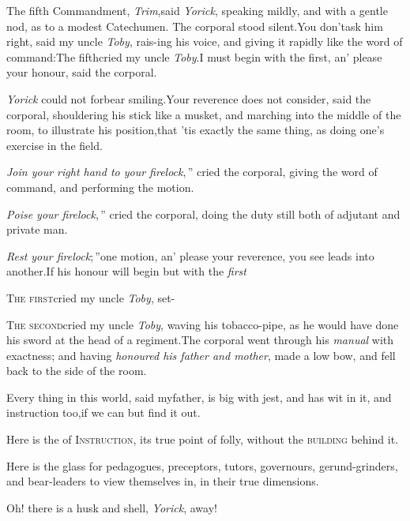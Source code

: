 \documentclass{article}
\begin{document}
\tsk The fifth Commandment, \textit{Trim},\tsk said \textit{Yorick},
speaking mildly, and with a gentle nod, as to a modest Catechumen. The
corporal stood silent.\tsk You don’t\break ask him right, said my uncle
\textit{Toby}, rais-\break ing his voice, and giving it rapidly like the word of
command:\tsh The fifth\break\tsh\tsh cried my uncle \textit{Toby}.\tsk I must
begin with the first, an’ please your honour, said the corporal.\tsh


\tsk \textit{Yorick} could not forbear smiling.\break\tsk Your
reverence does not consider, said the corporal, shouldering his
stick like a musket, and marching into the middle of the room, to
illustrate his position,\break\tsk that ’tis exactly the same
thing, as doing one’s exercise in the field.\tsk

\indent\lqq\textit{Join your right hand to your firelock},\,”
cried the corporal, giving the word of command, and performing the
motion.\tsk

\indent\lqq\textit{Poise your firelock},\,” cried the corporal,
doing the duty still both of adjutant and private man.\tsk

\indent\lqq\textit{Rest your firelock};\,”\tsk one motion,
an’ please your reverence, you see leads into
another.\tsk If his honour will begin but with the
\textit{first}\tsk

\textsc{The first}\tsk cried my uncle \textit{Toby},
set-\break
{}

\textsc{The second}\tsk cried my uncle \textit{Toby},
waving his tobacco-pipe, as he would have done his sword at the
head of a regiment.\tsk The corporal went through his
\textit{manual} with exactness; and having \textit{honoured his father and
mother}, made a low bow, and fell back to the side of the\break
room.

Every thing in this world, said my\break father, is big with jest, and
has wit in it, and instruction too,\tsk if we can but find it
out.


\tsk Here is the  of
\textsc{Instruction}, its true point of folly, without the
\textsc{building} behind it.


\tsk Here is the glass for pedagogues, preceptors, tutors,
governours, gerund-\break grinders, and bear-leaders to view themselves in,
in their true dimensions.\tsk{}

Oh! there is a husk and shell,
\textit{Yorick},\break
{}
away!
\end{document}
